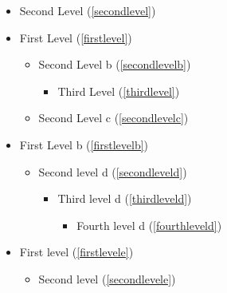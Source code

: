 \begin{itemize}

\item Second Level (\autoref{secondlevel})

\item First Level (\autoref{firstlevel})

\begin{itemize}

\item Second Level b (\autoref{secondlevelb})

\begin{itemize}

\item Third Level (\autoref{thirdlevel})

\end{itemize}

\item Second Level c (\autoref{secondlevelc})

\end{itemize}

\item First Level b (\autoref{firstlevelb})

\begin{itemize}

\item Second level d (\autoref{secondleveld})

\begin{itemize}

\item Third level d (\autoref{thirdleveld})

\begin{itemize}

\item Fourth level d (\autoref{fourthleveld})

\end{itemize}

\end{itemize}

\end{itemize}

\item First level  (\autoref{firstlevele})

\begin{itemize}

\item Second level  (\autoref{secondlevele})

\end{itemize}

\end{itemize}


